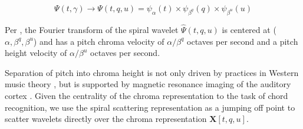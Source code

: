 \begin{equation}
\Psi(t,\gamma) \rightarrow \Psi(t,q,u) = \psi_{\alpha}(t) \times \psi_{\beta^q}(q) \times \psi_{\beta^u}(u)
\end{equation}

Per \cite{lostanlen2015wavelet}, the Fourier transform of the spiral wavelet $\hat{\Psi}(t,q,u)$ is centered at ($\alpha, \beta^q, \beta^u$) and has a pitch chroma velocity of $\alpha/\beta^q$ octaves per second and a pitch height velocity of $\alpha/\beta^u$ octaves per second. 

Separation of pitch into chroma height is not only driven by practices in Western music theory \cite{risset1969pitch}, but is supported by magnetic resonance imaging of the auditory cortex \cite{warren2003separating}.
Given the centrality of the chroma representation to the task of chord recognition, we use the spiral scattering representation as a jumping off point to scatter wavelets directly over the chroma representation $\mathbf{X}[t,q,u]$. 

